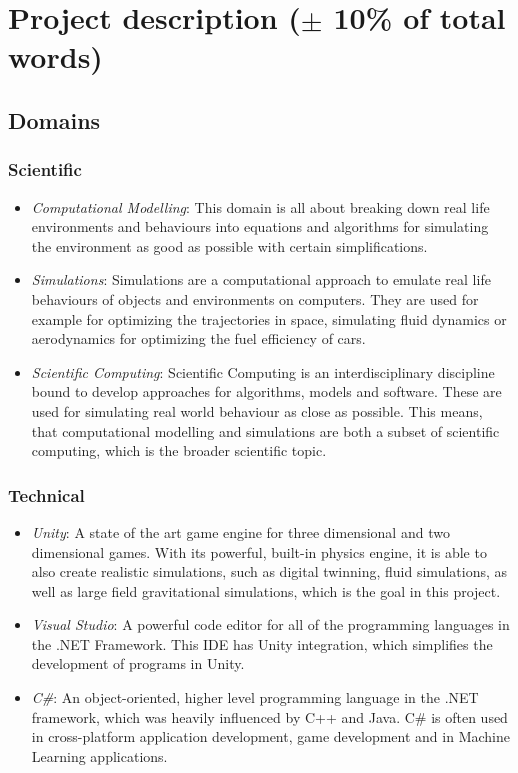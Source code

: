 \documentclass[conference,compsoc]{IEEEtran}
\begin{document}
\section{Project description ($\pm$ 10\% of total words) }
\subsection{Domains}
\subsubsection{Scientific}

\begin{itemize}
	\item \emph{Computational Modelling}: This domain is all about breaking down real life environments and behaviours into equations and algorithms for simulating the environment as good as possible with certain simplifications.
	\item \emph{Simulations}: Simulations are a computational approach to emulate real life behaviours of objects and environments on computers. They are used for example for optimizing the trajectories in space, simulating fluid dynamics or aerodynamics for optimizing the fuel efficiency of cars.
	\item \emph{Scientific Computing}: Scientific Computing is an interdisciplinary discipline bound to develop approaches for algorithms, models and software. These are used for simulating real world behaviour as close as possible. This means, that computational modelling and simulations are both a subset of scientific computing, which is the broader scientific topic. 
\end{itemize}
\subsubsection{Technical}
\begin{itemize}
	\item \emph{Unity}: A state of the art game engine for three dimensional and two dimensional games. With its powerful, built-in physics engine, it is able to also create realistic simulations, such as digital twinning, fluid simulations, as well as large field gravitational simulations, which is the goal in this project.
	\item \emph{Visual Studio}: A powerful code editor for all of the programming languages in the .NET Framework. This IDE has Unity integration, which simplifies the development of programs in Unity. 
	\item \emph{C\#}: An object-oriented, higher level programming language in the .NET framework, which was heavily influenced by C++ and Java. C\# is often used in cross-platform application development, game development and in Machine Learning applications.
\end{itemize}
\end{document}
